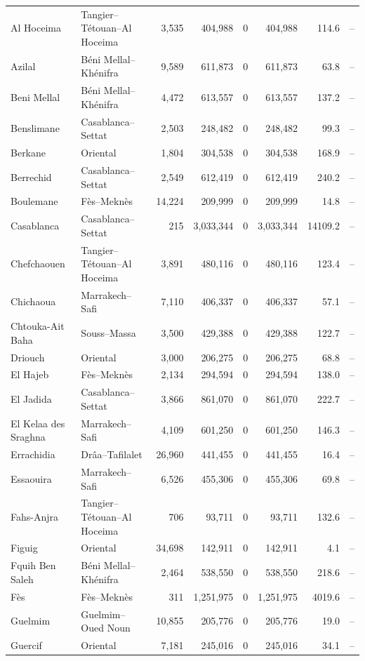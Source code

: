 \documentclass[10pt]{article}
\begin{document}
\begin{longtable}{@{}>{\raggedright\arraybackslash}p{3.0cm}>{\raggedright\arraybackslash}p{3.6cm}rrrrrl@{}}
Al Hoceima & Tangier--Tétouan--Al Hoceima & 3,535 & 404,988 & 0 & 404,988 & 114.6 & -- \\
Azilal & Béni Mellal--Khénifra & 9,589 & 611,873 & 0 & 611,873 & 63.8 & -- \\
Beni Mellal & Béni Mellal--Khénifra & 4,472 & 613,557 & 0 & 613,557 & 137.2 & -- \\
Benslimane & Casablanca--Settat & 2,503 & 248,482 & 0 & 248,482 & 99.3 & -- \\
Berkane & Oriental & 1,804 & 304,538 & 0 & 304,538 & 168.9 & -- \\
Berrechid & Casablanca--Settat & 2,549 & 612,419 & 0 & 612,419 & 240.2 & -- \\
Boulemane & Fès--Meknès & 14,224 & 209,999 & 0 & 209,999 & 14.8 & -- \\
Casablanca & Casablanca--Settat & 215 & 3,033,344 & 0 & 3,033,344 & 14109.2 & -- \\
Chefchaouen & Tangier--Tétouan--Al Hoceima & 3,891 & 480,116 & 0 & 480,116 & 123.4 & -- \\
Chichaoua & Marrakech--Safi & 7,110 & 406,337 & 0 & 406,337 & 57.1 & -- \\
Chtouka-Ait Baha & Souss--Massa & 3,500 & 429,388 & 0 & 429,388 & 122.7 & -- \\
Driouch & Oriental & 3,000 & 206,275 & 0 & 206,275 & 68.8 & -- \\
El Hajeb & Fès--Meknès & 2,134 & 294,594 & 0 & 294,594 & 138.0 & -- \\
El Jadida & Casablanca--Settat & 3,866 & 861,070 & 0 & 861,070 & 222.7 & -- \\
El Kelaa des Sraghna & Marrakech--Safi & 4,109 & 601,250 & 0 & 601,250 & 146.3 & -- \\
Errachidia & Drâa--Tafilalet & 26,960 & 441,455 & 0 & 441,455 & 16.4 & -- \\
Essaouira & Marrakech--Safi & 6,526 & 455,306 & 0 & 455,306 & 69.8 & -- \\
Fahs-Anjra & Tangier--Tétouan--Al Hoceima & 706 & 93,711 & 0 & 93,711 & 132.6 & -- \\
Figuig & Oriental & 34,698 & 142,911 & 0 & 142,911 & 4.1 & -- \\
Fquih Ben Saleh & Béni Mellal--Khénifra & 2,464 & 538,550 & 0 & 538,550 & 218.6 & -- \\
Fès & Fès--Meknès & 311 & 1,251,975 & 0 & 1,251,975 & 4019.6 & -- \\
Guelmim & Guelmim--Oued Noun & 10,855 & 205,776 & 0 & 205,776 & 19.0 & -- \\
Guercif & Oriental & 7,181 & 245,016 & 0 & 245,016 & 34.1 & -- \\

\end{longtable}
\end{document}
